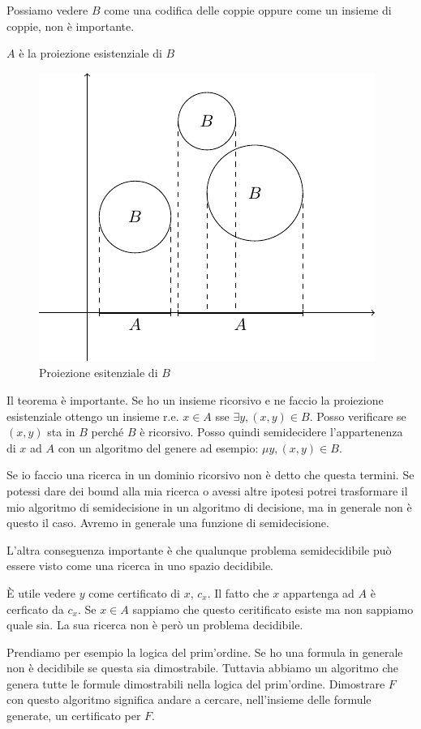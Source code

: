 Possiamo vedere $B$ come una codifica delle coppie oppure come un insieme di coppie, non è
importante.

$A$ è la proiezione esistenziale di $B$ 

\begin{figure}[h]
    \centering
    \includegraphics{./img/recursivesets/ExistentialProjection.pdf}
    \caption{Proiezione esitenziale di $B$}
\end{figure}

Il teorema è importante. Se ho un insieme ricorsivo e ne faccio la proiezione esistenziale ottengo
un insieme r.e. $x \in A$ sse $\exists y, (x,y) \in B$. Posso verificare se $(x,y)$ sta in $B$
perché $B$ è ricorsivo. Posso quindi semidecidere l'appartenenza di $x$ ad $A$ con un algoritmo del
genere ad esempio: $\mu y, (x,y) \in B$.

Se io faccio una ricerca in un dominio ricorsivo non è detto che questa termini. Se potessi dare dei
bound alla mia ricerca o avessi altre ipotesi potrei trasformare il mio algoritmo di semidecisione
in un algoritmo di decisione, ma in generale non è questo il caso. Avremo in generale una funzione
di semidecisione.

L'altra conseguenza importante è che qualunque problema semidecidibile può essere visto come una
ricerca in uno spazio decidibile.

È utile vedere $y$ come certificato di $x$, $c_{x}$. Il fatto che $x$ appartenga ad $A$ è cerficato da
$c_{x}$. Se $x \in A$ sappiamo che questo ceritificato esiste ma non sappiamo quale sia. La sua
ricerca non è però un problema decidibile.

Prendiamo per esempio la logica del prim'ordine. Se ho una formula in generale non è decidibile se
questa sia dimostrabile. Tuttavia abbiamo un algoritmo che genera tutte le formule dimostrabili nella
logica del prim'ordine. Dimostrare $F$ con questo algoritmo significa andare a cercare, nell'insieme
delle formule generate, un certificato per $F$. 

